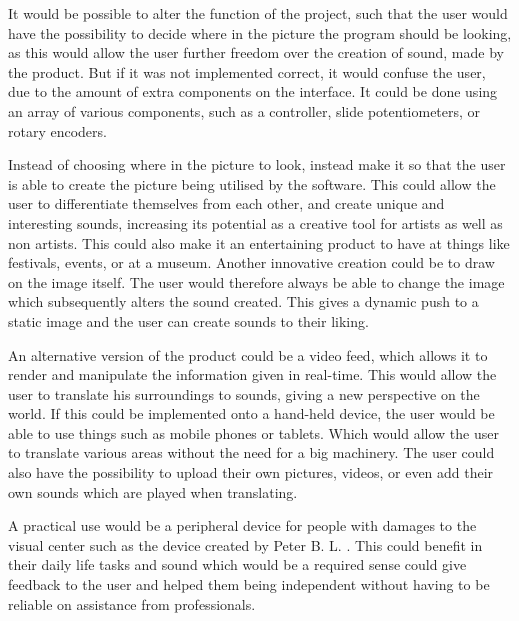 It would be possible to alter the function of the project, such that the user would have the possibility to decide where in the picture the program should be looking, as this would allow the user further freedom over the creation of sound, made by the product. But if it was not implemented correct, it would confuse the user, due to the amount of extra components on the interface. It could be done using an array of various components, such as a controller, slide potentiometers, or rotary encoders. 

Instead of choosing where in the picture to look, instead make it so that the user is able to create the picture being utilised by the software. This could allow the user to differentiate themselves from each other, and create unique and interesting sounds, increasing its potential as a creative tool for artists as well as non artists. This could also make it an entertaining product to have at things like festivals, events, or at a museum. Another innovative creation could be to draw on the image itself. The user would therefore always be able to change the image which subsequently alters the sound created. This gives a dynamic push to a static image and the user can create sounds to their liking.  

An alternative version of the product could be a video feed, which allows it to render and manipulate the information given in real-time. This would allow the user to translate his surroundings to sounds, giving a new perspective on the world. If this could be implemented onto a hand-held device, the user would be able to use things such as mobile phones or tablets. Which would allow the user to translate various areas without the need for a big machinery. The user could also have the possibility to upload their own pictures, videos, or even add their own sounds which are played when translating. 

A practical use would be a peripheral device for people with damages to the visual center such as the device created by Peter B. L. \cite{Meijer1992}. This could benefit in their daily life tasks and sound which would be a required sense could give feedback to the user and helped them being independent without having to be reliable on assistance from professionals.   
